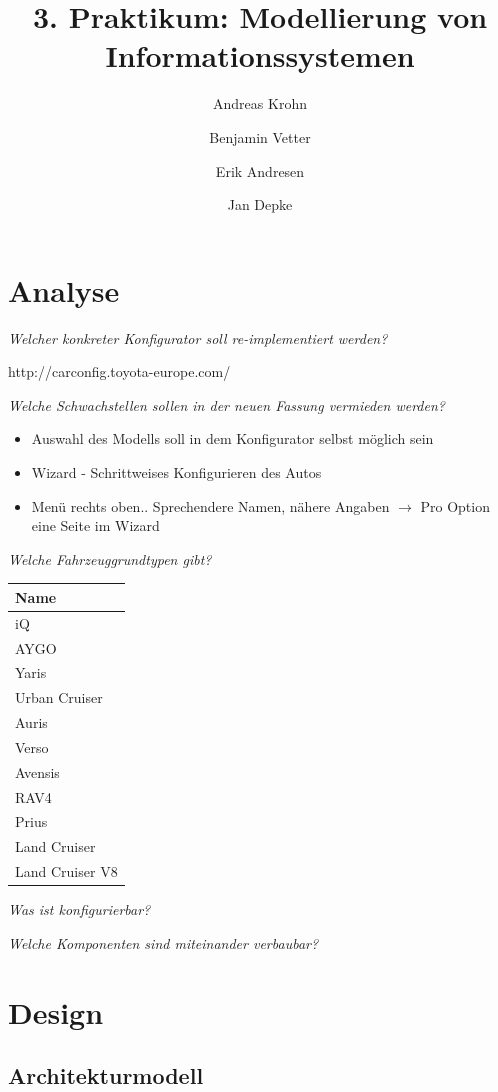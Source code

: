 \documentclass[a4paper,10pt]{article}
\title{3. Praktikum: Modellierung von Informationssystemen}
\author{Andreas Krohn \and Benjamin Vetter \and Erik Andresen \and Jan Depke}
\begin{document}
\maketitle

\tableofcontents

\section{Analyse}

\emph{Welcher konkreter Konfigurator soll re-implementiert werden?}

http://carconfig.toyota-europe.com/

\emph{Welche Schwachstellen sollen in der neuen Fassung vermieden werden?}

\begin{itemize}
 \item Auswahl des Modells soll in dem Konfigurator selbst möglich sein
 \item Wizard - Schrittweises Konfigurieren des Autos
 \item Menü rechts oben.. Sprechendere Namen, nähere Angaben $\rightarrow$ Pro Option eine Seite im Wizard
\end{itemize}

\emph{Welche Fahrzeuggrundtypen gibt?}

\begin{tabular}{|l|}
\hline
Name \\
\hline
iQ \\
AYGO \\
Yaris \\
Urban Cruiser \\
Auris \\
Verso \\
Avensis \\
RAV4 \\
Prius \\
Land Cruiser \\
Land Cruiser V8 \\
\hline
\end{tabular}

\emph{Was ist konfigurierbar?}

\emph{Welche Komponenten sind miteinander verbaubar?}

\section{Design}

\subsection*{Architekturmodell}
\end{document}
